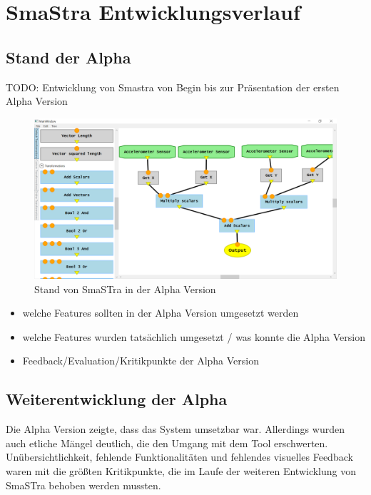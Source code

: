 \chapter{SmaStra Entwicklungsverlauf}

\section{Stand der Alpha}

{\color{red} TODO: Entwicklung von Smastra von Begin bis zur Pr\"asentation der ersten Alpha Version}

\begin{figure} [h!]
	\centering
		\includegraphics[width = \textwidth]{Screenshots/Smastra_0_0_alpha}
	\caption{Stand von SmaSTra in der Alpha Version}
	\label{fig:screenshot_0_0_alpha}
\end{figure}

\begin{itemize}
	\item welche Features sollten in der Alpha Version umgesetzt werden
	\item welche Features wurden tats\"achlich umgesetzt / was konnte die Alpha Version
	\item Feedback/Evaluation/Kritikpunkte der Alpha Version
\end{itemize}

\section{Weiterentwicklung der Alpha}

Die Alpha Version zeigte, dass das System umsetzbar war. Allerdings wurden auch etliche M\"angel deutlich, die den Umgang mit dem Tool erschwerten.
Un\"ubersichtlichkeit, fehlende Funktionalit\"aten und fehlendes visuelles Feedback waren mit die gr\"o{\ss}ten Kritikpunkte, die im Laufe der weiteren Entwicklung von SmaSTra behoben werden mussten.
